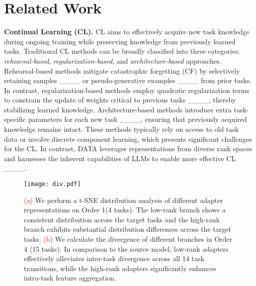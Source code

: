 \section{Related Work}
\noindent \textbf{Continual Learning (CL).} CL aims to effectively acquire new task knowledge during ongoing training while preserving knowledge from previously learned tasks. Traditional CL methods can be broadly classified into three categories: \textit{rehearsal-based}, \textit{regularization-based}, and \textit{architecture-based} approaches. Rehearsal-based methods mitigate catastrophic forgetting (CF) by selectively retaining samples ____ or pseudo-generative examples ____ from prior tasks. In contrast, regularization-based methods employ quadratic regularization terms to constrain the update of weights critical to previous tasks ____, thereby stabilizing learned knowledge. Architecture-based methods introduce extra task-specific parameters for each new task ____, ensuring that previously acquired knowledge remains intact. These methods typically rely on access to old task data or involve discrete component learning, which presents significant challenges for the CL. In contrast, DATA leverages representations from diverse rank spaces and harnesses the inherent capabilities of LLMs to enable more effective CL ____.

\begin{figure*}[t]
\centerline{\texttt{[image: div.pdf]}}
\caption{\textcolor{red}{(a)} We perform a t-SNE distribution analysis of different adapter representations on Order 1(4 tasks). The low-rank branch shows a consistent distribution across the target tasks and the high-rank branch exhibits substantial distribution differences across the target tasks. \textcolor{red}{(b)} We calculate the divergence of different branches in Order 4 (15 tasks). In comparison to the source model, low-rank adapters effectively alleviates inter-task divergence across all 14 task transitions, while the high-rank adapters significantly enhances intra-task feature aggregation.
}
\label{div}
\end{figure*}

